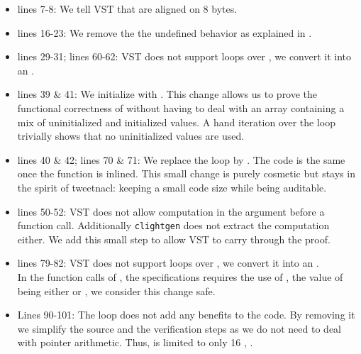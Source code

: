 \begin{itemize}
  \item lines 7-8: We tell VST that  are
  aligned on 8 bytes.

  \item lines 16-23: We remove the the undefined behavior as explained in .

  \item lines 29-31; lines 60-62: VST does not support  loops over , we convert it into an .

  \item lines 39 \& 41: We initialize  with .
  This change allows us to prove the functional correctness of  without having to deal with an array containing
  a mix of uninitialized and initialized values.
  A hand iteration over the loop trivially shows that no uninitialized values are used.

  \item lines 40 \& 42; lines 70 \& 71: We replace the  loop by . The code is the same once the function is inlined. This small change is purely cosmetic but stays in the spirit of tweetnacl: keeping a small code size while being auditable.

  \item lines 50-52: VST does not allow computation in the argument before a function call. Additionally \texttt{clightgen} does not extract the computation either. We add this small step to allow VST to carry through the proof.



  \item lines 79-82: VST does not support  loops over , we convert it into an .\\
  In the function calls of , the specifications requires the use of , the value of  being either  or , we consider this change safe.

  \item Lines 90-101: The  loop does not add any benefits to the code. By removing it we simplify the source and the verification steps as we do not need to deal with pointer arithmetic. Thus,  is limited to only 16 , \ie {}.

\end{itemize}
